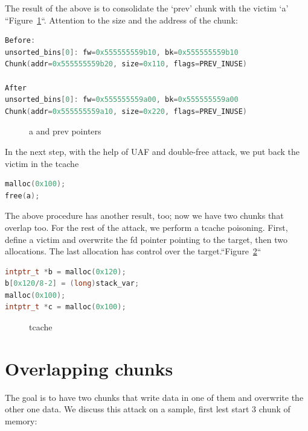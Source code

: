 \documentclass{masterthesis}
\newcommand*\tch{tcache}
\begin{document}
The result of the above is to consolidate the ‘prev’ chunk with the victim ‘a’ ``Figure~\ref{fig:gdb11}``. Attention to the size and the address of the chunk:

\begin{lstlisting}[language=c,frame=tlrb]
Before:
unsorted_bins[0]: fw=0x555555559b10, bk=0x555555559b10
Chunk(addr=0x555555559b20, size=0x110, flags=PREV_INUSE)

After
unsorted_bins[0]: fw=0x555555559a00, bk=0x555555559a00
Chunk(addr=0x555555559a10, size=0x220, flags=PREV_INUSE)
 \end{lstlisting}

\begin{figure}[h!]
 \caption{a and prev pointers}
 \label{fig:gdb11}
\end{figure}

In the next step, with the help of UAF and double-free attack, we put back the victim in the \tch{}

\begin{lstlisting}[language=c,frame=tlrb]
malloc(0x100);
free(a);
\end{lstlisting}

The above procedure has another result, too; now we have two chunks that overlap too. For the rest of the attack, we perform a \tch{} poisoning. First, define a victim and overwrite the fd pointer pointing to the target, then two allocations. The last allocation has control over the target.``Figure~\ref{fig:gdb12}``

\begin{lstlisting}[language=c,frame=tlrb]
intptr_t *b = malloc(0x120);
b[0x120/8-2] = (long)stack_var;
malloc(0x100);
intptr_t *c = malloc(0x100);
\end{lstlisting}

 \begin{figure}[h!]
 \caption{\tch{}}
 \label{fig:gdb12}
\end{figure}


\section{ Overlapping chunks}
The goal is to have two chunks that write data in one of them and overwrite the other one data. We discuss this attack on a sample, first lest start 3 chunk of memory:
\end{document}
